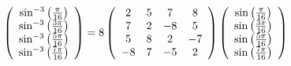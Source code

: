\documentclass[fleqn,a4paper,9pt]{article}
\begin{document}
\begin{flushleft}
\begin{equation}\notag
\left(
\begin{array}{c}
\sin^{-3}\left(\frac{\pi}{16}\right)   \\
\sin^{-3}\left(\frac{3\pi}{16}\right)  \\
\sin^{-3}\left(\frac{5\pi}{16}\right)  \\
\sin^{-3}\left(\frac{7\pi}{16}\right)  \\
\end{array}
\right)
=8\left(
\begin{array}{cccc}
 2 & 5 & 7 & 8 \\
 7 & 2 & -8 & 5 \\
 5 & 8 & 2 & -7 \\
 -8 & 7 & -5 & 2 \\
\end{array}
\right)
\left(
\begin{array}{c}
\sin\left(\frac{\pi}{16}\right)   \\
\sin\left(\frac{3\pi}{16}\right)  \\
\sin\left(\frac{5\pi}{16}\right)  \\
\sin\left(\frac{7\pi}{16}\right)  \\
\end{array}
\right)
\end{equation}


\end{flushleft}
\end{document}

